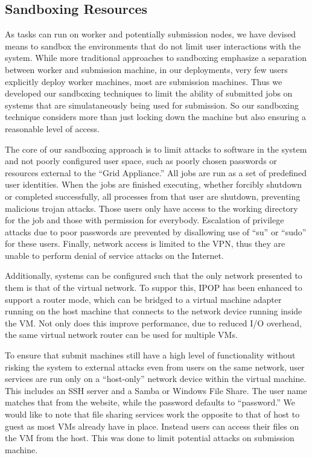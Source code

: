 \documentclass[conference]{IEEEtran}
\begin{document}
\subsection{Sandboxing Resources}

As tasks can run on worker and potentially submission nodes, we have devised
means to sandbox the environments that do not limit user interactions with the
system.  While more traditional approaches to sandboxing emphasize a separation
between worker and submission machine, in our deployments, very few users
explicitly deploy worker machines, most are submission machines.  Thus we
developed our sandboxing techniques to limit the ability of submitted jobs on
systems that are simulataneously being used for submission.  So our sandboxing
technique considers more than just locking down the machine but also ensuring a
reasonable level of access.

The core of our sandboxing approach is to limit attacks to software in the
system and not poorly configured user space, such as poorly chosen passwords or
resources external to the ``Grid Appliance.''  All jobs are run as a set of
predefined user identities.  When the jobs are finished executing, whether
forcibly shutdown or completed successfully, all processes from that user are
shutdown, preventing malicious trojan attacks.  Those users only have access to
the working directory for the job and those with permission for everybody.
Escalation of privilege attacks due to poor passwords are prevented by
disallowing use of ``su'' or ``sudo'' for these users.  Finally, network access
is limited to the VPN, thus they are unable to perform denial of service
attacks on the Internet.

Additionally, systems can be configured such that the only network presented to
them is that of the virtual network.  To suppor this, IPOP has been enhanced to
support a router mode, which can be bridged to a virtual machine adapter
running on the host machine that connects to the network device running inside
the VM.  Not only does this improve performance, due to reduced I/O overhead,
the same virtual network router can be used for multiple VMs.

To ensure that submit machines still have a high level of functionality without
risking the system to external attacks even from users on the same network,
user services are run only on a ``host-only'' network device within the virtual
machine.  This includes an SSH server and a Samba or Windows File Share.  The
user name matches that from the website, while the password defaults to
``password.''  We would like to note that file sharing services work the
opposite to that of host to guest as most VMs already have in place.  Instead
users can access their files on the VM from the host.  This was done to limit
potential attacks on submission machine.
\end{document}
